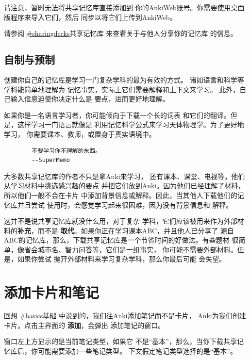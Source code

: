 \documentclass[a4paper]{book}
\begin{document}
	请注意，暂时无法将共享记忆库直接添加到 你的AnkiWeb账号。你需要使用桌面版程序来导入它们，然后 同步以将它们上传到AnkiWeb。
	
	请参阅 \url{#sharingdecks}共享记忆库 来查看关于与他人分享你的记忆库 的信息。
	
	\subsection{自制与预制}
	
	创建你自己的记忆库是学习一门复杂学科的最为有效的方式。 诸如语言和科学等学科能简单地理解为 记忆事实，实际上它们需要解释和上下文来学习。 此外，自己输入信息迫使你决定什么是 要点，进而更好地理解。
	
	如果你是一名语言学习者，你可能倾向于下载一个长的词表 和它们的翻译。但是，这样学习一门语言就像是 利用记忆科学公式来学习天体物理学。为了更好地学习， 你需要课本、教师，或置身于真实语境中。
	
	\begin{shaded}\begin{verbatim}
		不要学习你不理解的东西。
		--SuperMemo
		\end{verbatim}\end{shaded}
	
	大多数共享记忆库的作者不只是拿Anki来学习， 还有课本、课堂、电视等。他们从学习材料中挑选感兴趣的要点 并把它们放到Anki。因为他们已经理解了材料，所以他们一般不会在卡片 中添加背景信息或解释。因此，当其他人下载他们的记忆库并且尝试 使用时，会感觉学习起来很困难，因为没有背景信息和 解释。
	
	这并不是说共享记忆库就没什么用，对于复杂 学科，它们应该被用来作为外部材料的\textbf{补充}，而不是 \textbf{取代}。如果你正在学习课本ABC，并且他人已分享了 源自ABC的记忆库，那么，下载共享记忆库是一个节省时间的好做法。有些题材 很简单，像省会城市名、智力问答等，它们是一组事实， 你可能不需要外部材料。但是，如果你尝试 抛开外部材料来学习复杂学科，那么你最后可能 会失望。
	
	\section{添加卡片和笔记}
	
	回想 \url{#basics}基础 中说到的，我们往Anki添加笔记而不是卡片， Anki为我们创建卡片。点击主界面的 \textbf{添加}，会弹出 添加笔记的窗口。
	
	窗口左上方显示的是当前笔记类型，如果它 不是“基本”，那么，当你下载共享记忆库后，你可能需要添加一些笔记类型。 下文假定笔记类型选择的是“基本”。
	
\end{document}

